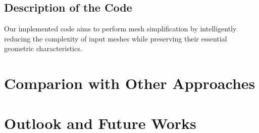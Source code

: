 \documentclass{article}
\begin{document}
\subsection{Description of the Code}
Our implemented code aims to perform mesh simplification by intelligently reducing the complexity of input meshes while preserving their essential geometric characteristics.

\section{Comparion with Other Approaches}

\section{Outlook and Future Works}

%
%
%
\newpage
\printbibliography
\end{document}
